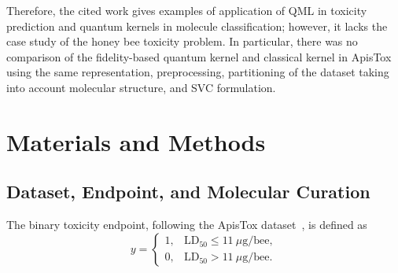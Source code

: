 \documentclass[conference]{IEEEtran}
\newif\ifdraftmode
\newcommand{\draftnote}[1]{%
  \ifdraftmode
    \par\noindent
    \colorbox{yellow!30}{\parbox{\dimexpr\columnwidth-2\fboxsep}{%
      \small\sffamily\textcolor{black!70}{#1}}}%
    \par\smallskip
  \fi
}
\begin{document}
Therefore, the cited work gives examples of application of QML in toxicity prediction and quantum kernels in molecule classification; however, it lacks the case study of the honey bee toxicity problem. In particular, there was no comparison of the fidelity-based quantum kernel and classical kernel in ApisTox using the same representation, preprocessing, partitioning of the dataset taking into account molecular structure, and SVC formulation.


\section{Materials and Methods}
\label{sec:methods}

\subsection{Dataset, Endpoint, and Molecular Curation}
\label{sec:dataset}

\draftnote{%
\textbf{Include:}\\
\textbullet\ Original ApisTox source (\texttt{adamczyk2025apistox}).\\
\textbullet\ Target species: \textit{Apis mellifera}.\\
\textbullet\ Strongest available acute-toxicity observation per compound.\\
\textbullet\ Binary classification (not LD$_{50}$ regression).\\
\textbullet\ Curation: 1,035 original $\to$ 893 final molecules.\\
\textbullet\ Exclusions: metals, inorganics, salts, mixtures, invalid
   structures, duplicates, missing values, non-finite descriptors.\\
\textbullet\ Rationale: define a coherent organic chemical domain.\\
\textbf{Do not:} state that difficult molecules were removed merely because
they were difficult to predict.}

The binary toxicity endpoint, following the ApisTox
dataset~\cite{adamczyk2025apistox}, is defined as
\begin{equation}
y=
\begin{cases}
1, & \mathrm{LD}_{50}\leq 11~\mu\mathrm{g/bee},\\
0, & \mathrm{LD}_{50}>11~\mu\mathrm{g/bee}.
\end{cases}
\label{eq:endpoint}
\end{equation}
\end{document}
